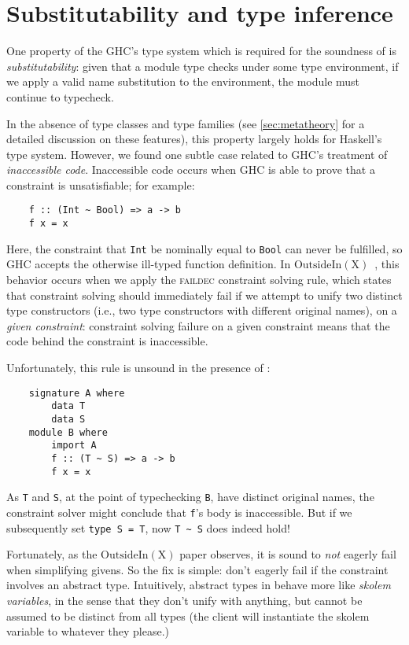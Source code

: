 \section{Substitutability and type inference}
\label{sec:substitutability}

One property of the GHC's type system which is required for
the soundness of \Backpack{} is \emph{substitutability}: given that
a module type checks under some type environment, if we apply a
valid name substitution to the environment, the module must
continue to typecheck.

In the absence of type classes and type families (see
\cref{sec:metatheory} for a detailed discussion on these
features), this property largely holds for Haskell's type system.
However, we found one subtle case related to GHC's treatment
of \emph{inaccessible code}.  Inaccessible code occurs when
GHC is able to prove that a constraint is unsatisfiable; for
example:

\begin{lstlisting}
    f :: (Int ~ Bool) => a -> b
    f x = x
\end{lstlisting}
%
Here, the constraint that \verb|Int| be nominally equal to \verb|Bool|
can never be fulfilled, so GHC accepts the otherwise ill-typed
function definition.  In $\mathrm{OutsideIn(X)}$~\cite{Vytiniotis:2011:OMT:2139531.2139533},
this behavior occurs when we apply the \textsc{faildec} constraint
solving rule, which states that
constraint solving should immediately fail if we attempt to unify
two distinct type constructors (i.e., two type constructors with
different original names), on a \emph{given
constraint}: constraint solving failure on a given constraint means that
the code behind the constraint is inaccessible.

Unfortunately, this rule is unsound in the presence of \Backpack{}:

\begin{lstlisting}
    signature A where
        data T
        data S
    module B where
        import A
        f :: (T ~ S) => a -> b
        f x = x
\end{lstlisting}

As \verb|T| and \verb|S|, at the point of typechecking \verb|B|, have
distinct original names, the constraint solver might conclude that
\verb|f|'s body is inaccessible.  But if we subsequently set
\verb|type S = T|, now \verb|T ~ S| does indeed hold!

Fortunately, as the $\mathrm{OutsideIn(X)}$ paper observes, it is sound
to \emph{not} eagerly fail when simplifying givens.  So the fix is simple:
don't eagerly fail if the constraint involves an abstract type.
Intuitively, abstract types in \Backpack{} behave more like \emph{skolem
variables}, in the sense that they don't unify with anything, but cannot
be assumed to be distinct from all types (the client will instantiate
the skolem variable to whatever they please.)


